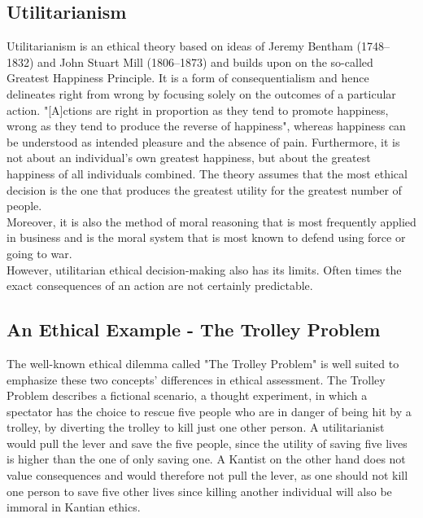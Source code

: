 \documentclass[10pt,twocolumn,twoside]{osajnl}
\begin{document}
\subsection{Utilitarianism}
Utilitarianism is an ethical theory based on ideas of Jeremy Bentham (1748--1832) and John Stuart Mill (1806--1873) and builds upon on the so-called Greatest Happiness Principle.%
It is a form of consequentialism and hence delineates right from wrong by focusing solely on the outcomes of a particular action. 
"[A]ctions are right in proportion as they tend to promote happiness, wrong as they tend to produce the reverse of happiness"\cite{utilitarianism}, whereas happiness can be understood as intended pleasure and the absence of pain.
Furthermore, it is not about an individual's own greatest happiness, but about the greatest happiness of all individuals combined\cite{utilitarianism}. 
The theory assumes that the most ethical decision is the one that produces the greatest utility for the greatest number of people.\\
Moreover, it is also the method of moral reasoning that is most frequently applied in business \cite{EthicsUnwrapped} and is the moral system that is most known to defend using force or going to war. \\
However, utilitarian ethical decision-making also has its limits. Often times the exact consequences of an action are not certainly predictable.


\subsection{An Ethical Example - The Trolley Problem}
The well-known ethical dilemma called "The Trolley Problem" is well suited to emphasize these two concepts' differences in ethical assessment. 
The Trolley Problem describes a fictional scenario, a thought experiment, in which a spectator has the choice to rescue five people who are in danger of being hit by a trolley, by diverting the trolley to kill just one other person. 
A utilitarianist would pull the lever and save the five people, since the utility of saving five lives is higher than the one of only saving one. A Kantist on the other hand
does not value consequences and would therefore not pull the lever, as one should not kill one person to save five other lives since killing another individual will also be immoral in Kantian ethics. 
\end{document}
